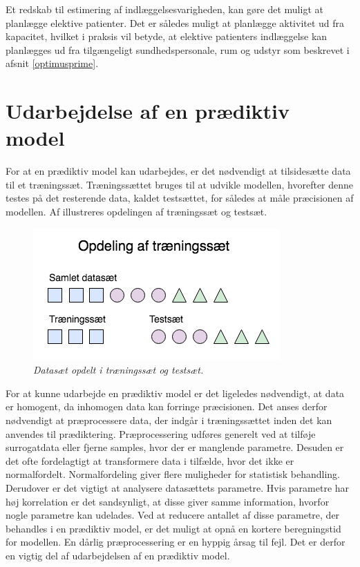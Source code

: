 Et redskab til estimering af indlæggelsesvarigheden, kan gøre det muligt at planlægge elektive patienter. Det er således muligt at planlægge aktivitet ud fra kapacitet, hvilket i praksis vil betyde, at elektive patienters indlæggelse kan planlægges ud fra tilgængeligt sundhedspersonale, rum og udstyr som beskrevet i afsnit \ref{optimusprime}. 


\section{Udarbejdelse af en prædiktiv model}
For at en prædiktiv model kan udarbejdes, er det nødvendigt at tilsidesætte data til et træningssæt. Træningssættet bruges til at udvikle modellen, hvorefter denne testes på det resterende data, kaldet testsættet, for således at måle præcisionen af modellen. Af  illustreres opdelingen af træningssæt og testsæt.

\begin{figure}[H]
	\centering
	\includegraphics[scale=.7]{figures/xval.png}
	\caption{\textit{Datasæt opdelt i træningssæt og testsæt.}\cite{Kuhn2013}}
	\label{traenings}
\end{figure}

\noindent
For at kunne udarbejde en prædiktiv model er det ligeledes nødvendigt, at data er homogent, da inhomogen data kan forringe præcisionen. 
Det anses derfor nødvendigt at præprocessere data, der indgår i træningssættet inden det kan anvendes til prædiktering.
Præprocessering udføres generelt ved at tilføje surrogatdata eller fjerne samples, hvor der er manglende parametre. Desuden er det ofte fordelagtigt at transformere data i tilfælde, hvor det ikke er normalfordelt. Normalfordeling giver flere muligheder for statistisk behandling.
Derudover er det vigtigt at analysere datasættets parametre. Hvis parametre har høj korrelation er det sandsynligt, at disse giver samme information, hvorfor nogle parametre kan udelades. Ved at reducere antallet af disse parametre, der behandles i en prædiktiv model, er det muligt at opnå en kortere beregningstid for modellen.
En dårlig præprocessering er en hyppig årsag til fejl. Det er derfor en vigtig del af udarbejdelsen af en prædiktiv model.\cite{Kuhn2013}


